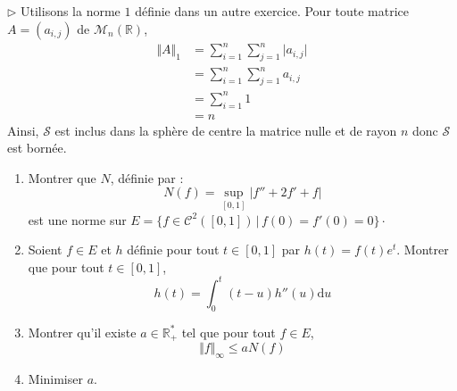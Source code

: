 \documentclass[a4paper,10pt]{report}
\begin{document}
\medskip

\noindent $\rhd$ Utilisons la norme $1$ définie dans un autre exercice. Pour toute matrice $A=(a_{i,j})$ de $\mathcal{M}_n(\mathbb{R})$,
\begin{align*}
\Vert A \Vert_1 & = \sum_{i = 1}^{n} \sum_{j = 1}^{n} \vert a_{i,j} \vert \\
& = \sum_{i = 1}^{n} \sum_{j = 1}^{n}  a_{i,j}  \\
 & = \sum_{i = 1}^{n} 1 \\
 & = n
\end{align*}
Ainsi, $\mathcal{S}$ est inclus dans la sphère de centre la matrice nulle et de rayon $n$ donc $\mathcal{S}$ est bornée.

\begin{Exa}
\begin{enumerate}
\item Montrer que $N$, définie par :
$$ N(f) = \sup_{[0,1]} \vert f''+2f'+f \vert $$
est une norme sur $E = \lbrace f \in \mathcal{C}^2([0,1]) \, \vert \, f(0)=f'(0)=0 \rbrace \cdot$
\item Soient $f \in E$ et $h$ définie pour tout $t \in [0,1]$ par $h(t)=f(t)e^t$. Montrer que pour tout $t \in [0,1]$,
$$ h(t) = \int_{0}^t (t-u) h''(u) \textrm{d}u$$
\item Montrer qu'il existe $a \in \mathbb{R}_+^{*}$ tel que pour tout $f \in E$,
$$ \Vert f \Vert_{\infty} \leq a N(f)$$
\item Minimiser $a$.
\end{enumerate}
\end{Exa}
\end{document}
